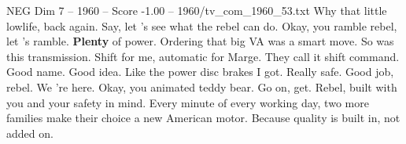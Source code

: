 \begin{textsample}{NEG Dim 7 – 1960 – Score -1.00 – 1960/tv\_com\_1960\_53.txt}  \label{ex:f7_neg_072}
Why that little lowlife, back again.
Say, let 's see what the rebel can do.
Okay, you ramble rebel, let 's ramble. \textbf{Plenty} of power.
Ordering that big VA was a smart move.
So was this transmission.
Shift for me, automatic for Marge.
They call it shift command.
Good name.
Good idea.
Like the power disc brakes I got.
Really safe.
Good job, rebel.
We 're here.
Okay, you animated teddy bear.
Go on, get.
Rebel, built with you and your safety in mind.
Every minute of every working day, two more families make their choice a new American motor.
Because quality is built in, not added on.

\end{textsample}
